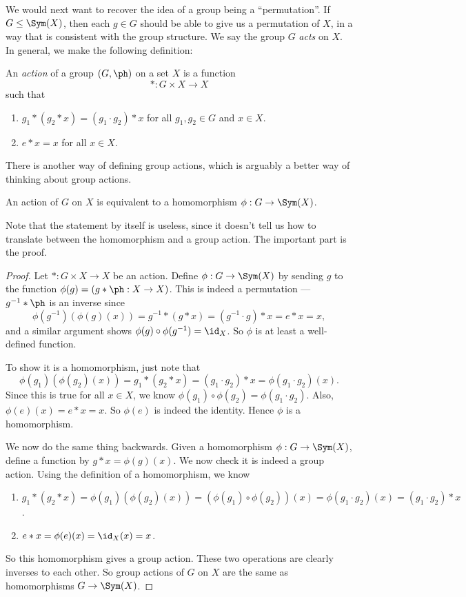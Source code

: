 \documentclass[a4paper]{article}
\begin{document}
We would next want to recover the idea of a group being a ``permutation''. If $G \leq \Sym(X)$, then each $g \in G$ should be able to give us a permutation of $X$, in a way that is consistent with the group structure. We say the group $G$ \emph{acts} on $X$. In general, we make the following definition:

\begin{defi}
  An \emph{action} of a group $(G, \ph)$ on a set $X$ is a function
  \[
    *: G\times X \to X
  \]
  such that
  \begin{enumerate}
    \item $g_1 * (g_2 * x) = (g_1 \cdot g_2) * x$ for all $g_1, g_2 \in G$ and $x \in X$.
    \item $e * x = x$ for all $x \in X$.
  \end{enumerate}
\end{defi}
There is another way of defining group actions, which is arguably a better way of thinking about group actions.

\begin{lemma}
  An action of $G$ on $X$ is equivalent to a homomorphism $\phi: G \to \Sym(X)$.
\end{lemma}
Note that the statement by itself is useless, since it doesn't tell us how to translate between the homomorphism and a group action. The important part is the proof.
\begin{proof}
  Let $*: G \times X \to X$ be an action. Define $\phi: G \to \Sym(X)$ by sending $g$ to the function $\phi(g) = (g * \ph : X \to X)$. This is indeed a permutation --- $g^{-1} * \ph$ is an inverse since
  \[
    \phi(g^{-1})(\phi(g)(x)) = g^{-1} * (g * x) = (g^{-1} \cdot g) * x = e * x = x,
  \]
  and a similar argument shows $\phi(g) \circ \phi(g^{-1}) = \id_X$. So $\phi$ is at least a well-defined function.

  To show it is a homomorphism, just note that
  \[
    \phi(g_1)(\phi(g_2)(x)) = g_1 * (g_2 * x) = (g_1 \cdot g_2) * x = \phi(g_1 \cdot g_2)(x).
  \]
  Since this is true for all $x \in X$, we know $\phi(g_1)\circ \phi(g_2) = \phi(g_1 \cdot g_2)$. Also, $\phi(e)(x) = e * x = x$. So $\phi(e)$ is indeed the identity. Hence $\phi$ is a homomorphism.

  We now do the same thing backwards. Given a homomorphism $\phi: G \to \Sym(X)$, define a function by $g * x = \phi(g)(x)$. We now check it is indeed a group action. Using the definition of a homomorphism, we know
  \begin{enumerate}
    \item $g_1 * (g_2 * x) = \phi(g_1)(\phi(g_2)(x)) = (\phi(g_1) \circ \phi(g_2))(x) = \phi(g_1 \cdot g_2)(x) = (g_1 \cdot g_2) * x$.
    \item $e * x = \phi(e)(x) = \id_X(x) = x$.
  \end{enumerate}
  So this homomorphism gives a group action. These two operations are clearly inverses to each other. So group actions of $G$ on $X$ are the same as homomorphisms $G \to \Sym(X)$.
\end{proof}
\end{document}

